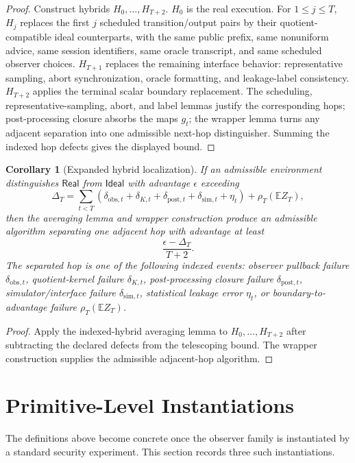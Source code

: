 \documentclass[11pt]{article}
\theoremstyle{definition}
\theoremstyle{plain}
\newtheorem{corollary}[definition]{Corollary}
\theoremstyle{remark}
\newcommand{\E}{\mathbb{E}}
\newcommand{\Real}{\mathsf{Real}}
\newcommand{\Ideal}{\mathsf{Ideal}}
\begin{document}
\begin{proof}
Construct hybrids $H_0,\ldots,H_{T+2}$. $H_0$ is the real execution. For $1\le j\le T$, $H_j$ replaces the first $j$ scheduled transition/output pairs by their quotient-compatible ideal counterparts, with the same public prefix, same nonuniform advice, same session identifiers, same oracle transcript, and same scheduled observer choices. $H_{T+1}$ replaces the remaining interface behavior: representative sampling, abort synchronization, oracle formatting, and leakage-label consistency. $H_{T+2}$ applies the terminal scalar boundary replacement. The scheduling, representative-sampling, abort, and label lemmas justify the corresponding hops; post-processing closure absorbs the maps $g_t$; the wrapper lemma turns any adjacent separation into one admissible next-hop distinguisher. Summing the indexed hop defects gives the displayed bound.
\end{proof}

\begin{corollary}[Expanded hybrid localization]
If an admissible environment distinguishes $\Real$ from $\Ideal$ with advantage $\epsilon$ exceeding
\[
\Delta_T=\sum_{t<T}(\delta_{\mathrm{obs},t}+\delta_{K,t}+\delta_{\mathrm{post},t}+\delta_{\mathrm{sim},t}+\eta_t)+\rho_T(\E Z_T),
\]
then the averaging lemma and wrapper construction produce an admissible algorithm separating one adjacent hop with advantage at least
\[
\frac{\epsilon-\Delta_T}{T+2}.
\]
The separated hop is one of the following indexed events: observer pullback failure $\delta_{\mathrm{obs},t}$, quotient-kernel failure $\delta_{K,t}$, post-processing closure failure $\delta_{\mathrm{post},t}$, simulator/interface failure $\delta_{\mathrm{sim},t}$, statistical leakage error $\eta_t$, or boundary-to-advantage failure $\rho_T(\E Z_T)$.
\end{corollary}

\begin{proof}
Apply the indexed-hybrid averaging lemma to $H_0,\ldots,H_{T+2}$ after subtracting the declared defects from the telescoping bound. The wrapper construction supplies the admissible adjacent-hop algorithm.
\end{proof}

\section{Primitive-Level Instantiations}

The definitions above become concrete once the observer family is instantiated by a standard security experiment. This section records three such instantiations.
\end{document}
